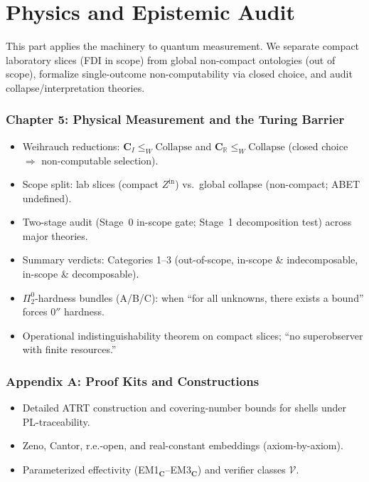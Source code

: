 \documentclass[12pt]{article}
\begin{document}
\part[Physics and Epistemic Audit]{Physics and Epistemic Audit}

This part applies the machinery to quantum measurement. We separate compact laboratory slices (FDI in scope) from global non-compact ontologies (out of scope), formalize single-outcome non-computability via closed choice, and audit collapse/interpretation theories.

\section*{Chapter 5: Physical Measurement and the Turing Barrier}
\begin{itemize}
  \item Weihrauch reductions: $\mathbf{C}_I \le_W \mathrm{Collapse}$ and $\mathbf{C}_{\mathbb R} \le_W \mathrm{Collapse}$ (closed choice $\Rightarrow$ non-computable selection).
  \item Scope split: lab slices (compact $Z^{\mathrm{in}}$) vs.\ global collapse (non-compact; ABET undefined).
  \item Two-stage audit (Stage~0 in-scope gate; Stage~1 decomposition test) across major theories.
  \item Summary verdicts: Categories 1–3 (out-of-scope, in-scope \& indecomposable, in-scope \& decomposable).
  \item $\Pi^0_2$-hardness bundles (A/B/C): when “for all unknowns, there exists a bound” forces $0''$ hardness.
  \item Operational indistinguishability theorem on compact slices; “no superobserver with finite resources.”
\end{itemize}

\appendix
\section*{Appendix A: Proof Kits and Constructions}
\begin{itemize}
  \item Detailed ATRT construction and covering-number bounds for shells under PL-traceability.
  \item Zeno, Cantor, r.e.-open, and real-constant embeddings (axiom-by-axiom).
  \item Parameterized effectivity (EM1$_{\mathbf C}$–EM3$_{\mathbf C}$) and verifier classes $\mathcal V$.
\end{itemize}
\end{document}

